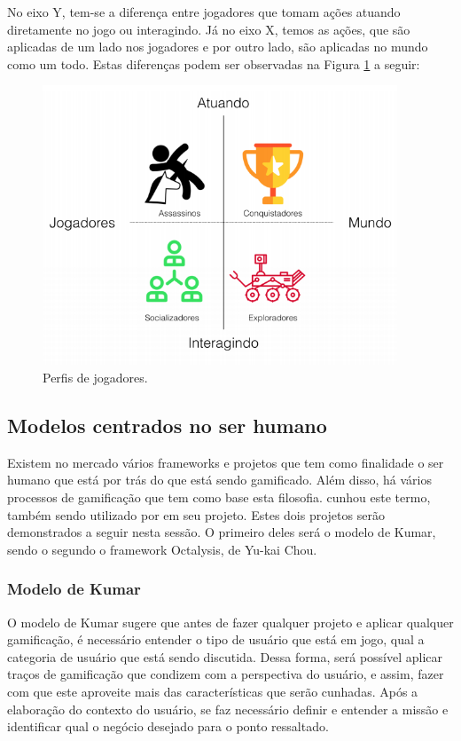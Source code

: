 No eixo Y, tem-se a diferença entre jogadores
que tomam ações atuando diretamente no jogo ou interagindo. Já no eixo X, temos as ações,
que são aplicadas de um lado nos jogadores e por outro lado, são aplicadas no mundo como
um todo. Estas diferenças podem ser observadas na Figura \ref{fig:perfiljogadores} a seguir:

\begin{figure}[h]
    \centering
    \includegraphics[width=400px, scale=1]{figuras/perfiljogadores}
    \caption{Perfis de jogadores.}
    \label{fig:perfiljogadores}
\end{figure}


\subsection{Modelos centrados no ser humano}
\label{sub:modelosnoserhumano}
Existem no mercado vários frameworks e projetos que tem como finalidade o ser
humano que está por trás do que está sendo gamificado. Além disso, há
vários processos de gamificação que tem como base esta filosofia. 
\cite{kumar2013gamification}
cunhou este termo, também sendo utilizado por \cite{chou2015actionable} em seu projeto.
Estes dois projetos serão demonstrados a seguir nesta sessão. O primeiro
deles será o modelo de Kumar, sendo o segundo o framework Octalysis, de Yu-kai Chou.

\subsubsection{Modelo de Kumar}
\label{sub:modelodekumar}
O modelo de Kumar sugere que antes de fazer qualquer projeto e aplicar qualquer gamificação,
é necessário entender o tipo de usuário que está em jogo, qual a categoria de usuário
que está sendo discutida. Dessa forma, será possível aplicar traços de gamificação
que condizem com a perspectiva do usuário, e assim, fazer com que este aproveite
mais das características que serão cunhadas. Após a elaboração do contexto do
usuário, se faz necessário definir e entender a missão e identificar qual o negócio
desejado para o ponto ressaltado.

